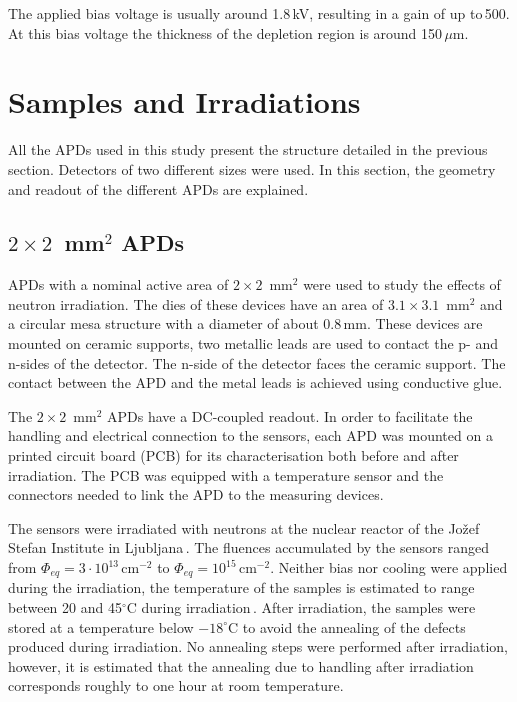 \documentclass[review,number,sort&compress]{elsarticle}
\begin{document}
The applied bias voltage is usually around 1.8\,kV, resulting in a gain of up to\,500.
At this bias voltage the thickness of the depletion region is around 150\,$\mu$m.


\section{Samples and Irradiations}
\label{sec:samples}

All the APDs used in this study present the structure detailed in the previous section.
Detectors of two different sizes were used.
In this section, the geometry and readout of the different APDs are explained.

\subsection{$2 \times 2$~mm$^2$ APDs}

APDs with a nominal active area of $2 \times 2$~mm$^2$ were used to study the effects of neutron irradiation.
The dies of these devices have an area of $3.1 \times 3.1$~mm$^2$ and a circular mesa structure with a diameter of about 0.8\,mm.
These devices are mounted on ceramic supports, two metallic leads are used to contact the p- and n-sides of the detector.
The n-side of the detector faces the ceramic support.
The contact between the APD and the metal leads is achieved using conductive glue.

The $2 \times 2$~mm$^2$ APDs have a DC-coupled readout.
In order to facilitate the handling and electrical connection to the sensors, each APD was mounted on a printed circuit board (PCB) for its characterisation both before and after irradiation.
The PCB was equipped with a temperature sensor and the connectors needed to link the APD to the measuring devices.

The sensors were irradiated with neutrons at the nuclear reactor of the Jo\v{z}ef Stefan Institute in Ljubljana\,\cite{jsiIrrad}.
The fluences accumulated by the sensors ranged from $\Phi_{eq} = 3 \cdot 10^{13}$\,cm$^{-2}$ to $\Phi_{eq} = 10^{15}$\,cm$^{-2}$.
Neither bias nor cooling were applied during the irradiation, the temperature of the samples is estimated to range between 20 and 45$^\circ$C during irradiation\,\cite{vlado}.
After irradiation, the samples were stored at a temperature below $-18^\circ$C to avoid the annealing of the defects produced during irradiation.
No annealing steps were performed after irradiation, however, it is estimated that the annealing due to handling after irradiation corresponds roughly to one hour at room temperature.
\end{document}
